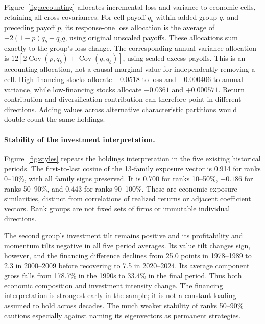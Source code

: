 Figure~\ref{fig:accounting} allocates incremental loss and variance to economic cells, retaining all cross-covariances. For cell payoff $q_b$ within added group $q$, and preceding payoff $p$, its response-one loss allocation is the average of $-2(1-p)q_b+q_bq$, using original unscaled payoffs. These allocations sum exactly to the group's loss change. The corresponding annual variance allocation is $12[2\operatorname{Cov}(p,q_b)+\operatorname{Cov}(q,q_b)]$, using scaled excess payoffs. This is an accounting allocation, not a causal marginal value for independently removing a cell. High-financing stocks allocate $-0.0518$ to loss and $-0.000406$ to annual variance, while low-financing stocks allocate $+0.0361$ and $+0.000571$. Return contribution and diversification contribution can therefore point in different directions. Adding values across alternative characteristic partitions would double-count the same holdings.


\paragraph{Stability of the investment interpretation.}
Figure~\ref{fig:styles} repeats the holdings interpretation in the five existing historical periods. The first-to-last cosine of the 13-family exposure vector is 0.914 for ranks 0--10\%, with all family signs preserved. It is 0.700 for ranks 10--50\%, $-0.186$ for ranks 50--90\%, and 0.443 for ranks 90--100\%. These are economic-exposure similarities, distinct from correlations of realized returns or adjacent coefficient vectors. Rank groups are not fixed sets of firms or immutable individual directions.

The second group's investment tilt remains positive and its profitability and momentum tilts negative in all five period averages. Its value tilt changes sign, however, and the financing difference declines from 25.0 points in 1978--1989 to 2.3 in 2000--2009 before recovering to 7.5 in 2020--2024. Its average component gross falls from 178.7\% in the 1990s to 33.4\% in the final period. Thus both economic composition and investment intensity change. The financing interpretation is strongest early in the sample; it is not a constant loading assumed to hold across decades. The much weaker stability of ranks 50--90\% cautions especially against naming its eigenvectors as permanent strategies.

